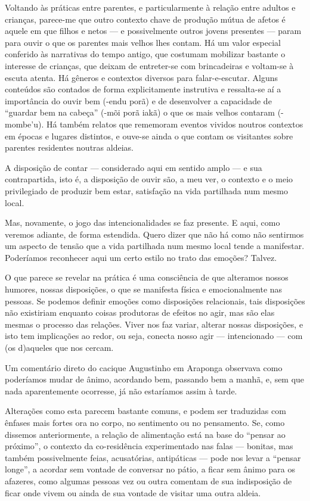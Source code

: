 Voltando às práticas entre parentes, e particularmente à relação entre
adultos e crianças, parece-me que outro contexto chave de produção
mútua de afetos é aquele em que filhos e netos — e possivelmente outros
jovens presentes — param para ouvir o que os parentes mais velhos lhes
contam. Há um valor especial conferido às narrativas do tempo antigo,
que costumam mobilizar bastante o interesse de crianças, que deixam de
entreter-se com brincadeiras e voltam-se à escuta atenta. Há gêneros e
contextos diversos para falar-e-escutar. Alguns conteúdos são contados
de forma explicitamente instrutiva e ressalta-se aí a importância do
ouvir bem (-endu porã) e de desenvolver a capacidade de ``guardar bem na
cabeça'' (-mõi porã iakã) o que os mais velhos contaram (-mombe’u). Há
também relatos que rememoram eventos vividos noutros contextos em
épocas e lugares distintos, e ouve-se ainda o que contam os visitantes
sobre parentes residentes noutras aldeias.

A disposição de contar — considerado aqui em sentido amplo — e sua
contrapartida, isto é, a disposição de ouvir são, a meu ver, o contexto
e o meio privilegiado de produzir bem estar, satisfação na vida
partilhada num mesmo local.

Mas, novamente, o jogo das intencionalidades se faz presente. E aqui, como
veremos adiante, de forma estendida. Quero dizer que não há como não
sentirmos um aspecto de tensão que a vida partilhada num mesmo local
tende a manifestar. Poderíamos reconhecer aqui um certo estilo no trato
das emoções? Talvez.

O que parece se revelar na prática é uma consciência de que alteramos
nossos humores, nossas disposições, o que se manifesta física e
emocionalmente nas pessoas. Se podemos definir emoções como disposições
relacionais, tais disposições não existiriam enquanto coisas produtoras
de efeitos no agir, mas são elas mesmas o processo das relações. Viver
nos faz variar, alterar nossas disposições, e isto tem implicações ao
redor, ou seja, conecta nosso agir — intencionado — com (os d)aqueles
que nos cercam. 

Um comentário direto do cacique Augustinho em Araponga observava como
poderíamos mudar de ânimo, acordando bem, passando bem a manhã, e, sem
que nada aparentemente ocorresse, já não estaríamos assim à tarde.

Alterações como esta parecem bastante comuns, e podem ser traduzidas com
ênfases mais fortes ora no corpo, no sentimento ou no pensamento. Se,
como dissemos anteriormente, a relação de alimentação está na base do
``pensar ao próximo'', o contexto da co-residência experimentado nas
falas — bonitas, mas também possivelmente feias, acusatórias,
antipáticas — pode nos levar a ``pensar longe'', a acordar sem vontade de
conversar no pátio, a ficar sem ânimo para os afazeres, como
algumas pessoas vez ou outra comentam de sua indisposição de ficar onde
vivem ou ainda de sua vontade de visitar uma outra aldeia.

